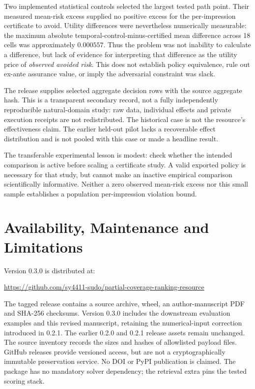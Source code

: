 \documentclass[runningheads]{llncs}
\begin{document}
Two implemented statistical controls selected the largest tested path point.
Their measured mean-risk excess supplied no positive excess for the
per-impression certificate to avoid. Utility differences were nevertheless
numerically measurable: the maximum absolute temporal-control-minus-certified
mean difference across 18 cells was approximately $0.000557$.
Thus the problem was not inability to calculate a difference, but lack of
evidence for interpreting that difference as the utility price of \emph{observed
avoided risk}. This does not establish policy equivalence, rule out ex-ante
assurance value, or imply the adversarial constraint was slack.

The release supplies selected aggregate decision rows with the source aggregate
hash. This is a transparent secondary record, not a fully independently
reproducible natural-domain study: raw data, individual effects and private
execution receipts are not redistributed. The historical case is not the
resource's effectiveness claim. The earlier held-out pilot lacks a recoverable
effect distribution and is not pooled with this case or made a headline result.

The transferable experimental lesson is modest: check whether the intended
comparison is active before scaling a certificate study. A valid exported
policy is necessary for that study, but cannot make an inactive empirical
comparison scientifically informative. Neither a zero observed mean-risk excess
nor this small sample establishes a population per-impression violation bound.

\section{Availability, Maintenance and Limitations}
Version 0.3.0 is distributed at:
\begin{center}\small
\url{https://github.com/sy4411-sudo/partial-coverage-ranking-resource}
\end{center}
The tagged release contains a source archive, wheel, an author-manuscript
PDF and SHA-256 checksums. Version 0.3.0 includes the downstream evaluation
examples and this revised manuscript, retaining the numerical-input correction
introduced in 0.2.1. The earlier 0.2.0 and 0.2.1 release assets remain unchanged.
The source inventory records the sizes and hashes of
allowlisted payload files. GitHub releases provide versioned access, but are
not a cryptographically immutable preservation service. No DOI or PyPI
publication is claimed. The package has no mandatory solver dependency;
the retrieval extra pins the tested scoring stack.
\end{document}
